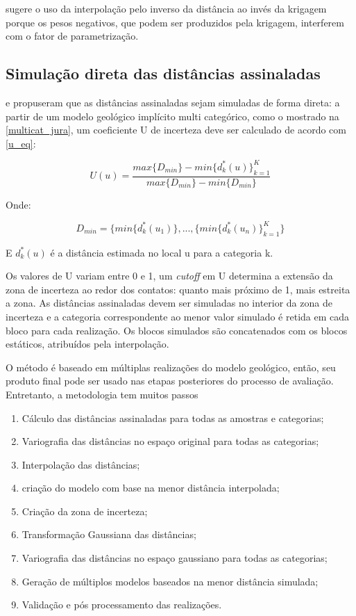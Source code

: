  sugere o uso da interpolação pelo inverso da distância ao invés da krigagem porque os pesos negativos, que podem ser produzidos pela krigagem, interferem com o fator de parametrização.

\subsection{Simulação direta das distâncias assinaladas}\label{sim_direta}

 e  propuseram que as distâncias assinaladas sejam simuladas de forma direta: a partir de um modelo geológico implícito multi categórico, como o mostrado na \autoref{multicat_jura}, um coeficiente U de incerteza deve ser calculado de acordo com \autoref{u_eq}:

\begin{equation}\label{u_eq}
    U(u)=\frac{max\{D_{min}\}-min\{d^*_k(u)\}^K_{k=1}}{max\{D_{min}\}-min\{D_{min}\}}
\end{equation}

Onde:

\begin{equation}
    D_{min}=\{min\{d^*_k(u_1)\},...,\{min\{d^*_k(u_n)\}^K_{k=1}\}
\end{equation}

E $d^*_k(u)$ é a distância estimada no local u para a categoria k.

Os valores de U variam entre 0 e 1, um \textit{cutoff} em U determina a extensão da zona de incerteza ao redor dos contatos: quanto mais próximo de 1, mais estreita a zona. As distâncias assinaladas devem ser simuladas no interior da zona de incerteza e a categoria correspondente ao menor valor simulado é retida em cada bloco para cada realização. Os blocos simulados são concatenados com os blocos estáticos, atribuídos pela interpolação.

O método é baseado em múltiplas realizações do modelo geológico, então, seu produto final pode ser usado nas etapas posteriores do processo de avaliação. Entretanto, a metodologia tem muitos passos \cite{radtke_dissertacao}

\begin{enumerate}[label=\roman*]
\item Cálculo das distâncias assinaladas para todas as amostras e categorias;
\item Variografia das distâncias no espaço original para todas as categorias;
\item Interpolação das distâncias; 
\item criação do modelo com base na menor distância interpolada;
\item Criação da zona de incerteza;
\item Transformação Gaussiana das distâncias;
\item Variografia das distâncias no espaço gaussiano para todas as categorias;
\item Geração de múltiplos modelos baseados na menor distância simulada;
\item Validação e pós processamento das realizações.
\end{enumerate}

